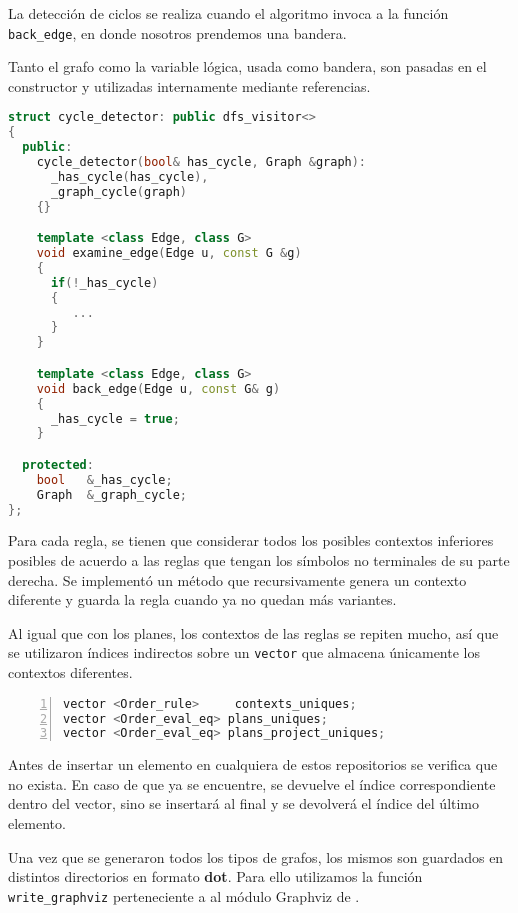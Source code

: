 La detección de ciclos se realiza cuando el algoritmo invoca a la función \texttt{back\_edge}, en donde nosotros prendemos una bandera.

Tanto el grafo como la variable lógica, usada como bandera, son pasadas en el constructor y utilizadas internamente mediante referencias.

\begin{lstlisting}[language=C++, basicstyle=\scriptsize, columns=fullflexible, linewidth=8.5cm]
struct cycle_detector: public dfs_visitor<>
{
  public:
    cycle_detector(bool& has_cycle, Graph &graph):
      _has_cycle(has_cycle), 
      _graph_cycle(graph)
    {}

    template <class Edge, class G>
    void examine_edge(Edge u, const G &g)
    {
      if(!_has_cycle)
      {
         ...
      }
    }

    template <class Edge, class G>
    void back_edge(Edge u, const G& g)
    {
      _has_cycle = true;
    }

  protected:
    bool   &_has_cycle;
    Graph  &_graph_cycle;
};
\end{lstlisting}

Para cada regla, se tienen que considerar todos los posibles contextos inferiores posibles de acuerdo a las reglas que tengan los símbolos no terminales de su parte derecha. Se implementó un método que recursivamente genera un contexto diferente y guarda la regla cuando ya no quedan más variantes.

Al igual que con los planes, los contextos de las reglas se repiten mucho, así que se utilizaron índices indirectos sobre un \texttt{vector} que almacena únicamente los contextos diferentes.

\begin{lstlisting}[language=C++, basicstyle=\scriptsize, numbers=left, columns=fullflexible, linewidth=8cm]
vector <Order_rule>     contexts_uniques;
vector <Order_eval_eq> plans_uniques;
vector <Order_eval_eq> plans_project_uniques;
\end{lstlisting}

Antes de insertar un elemento en cualquiera de estos repositorios se verifica que no exista. En caso de que ya se encuentre, se devuelve el índice correspondiente dentro del vector, sino se insertará al final y se devolverá el índice del último elemento.

Una vez que se generaron todos los tipos de grafos, los mismos son guardados en distintos directorios en formato \textbf{dot}\cite{dot}. Para ello utilizamos la función \texttt{write\_graphviz} perteneciente a al módulo Graphviz de \boost.

